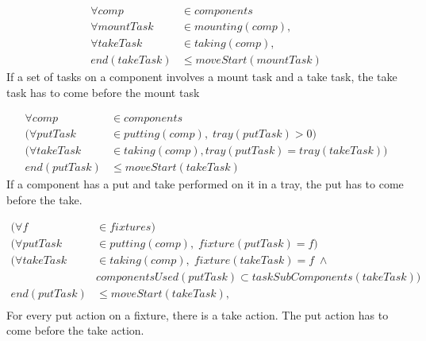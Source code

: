  
 \begin{equation}
 \begin{aligned}\label{eq:97}
 \forall comp &\in components \\
 \forall mountTask &\in mounting(comp), \\
 \forall takeTask &\in taking(comp), \\
 end(takeTask) &\le moveStart(mountTask)
 \end{aligned}
 \end{equation}
 If a set of tasks on a component involves a mount task and a take task, the take task has to come before the mount task
 
 
 \begin{equation}
 \begin{aligned}\label{eq:98}
 \forall comp &\in components \\
 (\forall putTask &\in putting(comp), \; tray(putTask) > 0)\\
 (\forall takeTask &\in taking(comp), tray(putTask) = tray(takeTask))\\
 end(putTask) &\le moveStart(takeTask)
 \end{aligned}
 \end{equation}
 If a component has a put and take performed on it in a tray, the put has to come before the take.
 
 
 \begin{equation}
 \begin{aligned}\label{eq:99}
 (\forall f &\in fixtures) \\
 (\forall putTask &\in putting(comp), \; fixture(putTask) = f)\\
 (\forall takeTask &\in taking(comp), \; fixture(takeTask) = f \; \land \\
 &componentsUsed(putTask) \subset taskSubComponents(takeTask)) \\
 end(putTask) &\le moveStart(takeTask), \\
 \end{aligned}
 \end{equation}
 For every put action on a fixture, there is a take action. The put action has to come before the take action.
 
